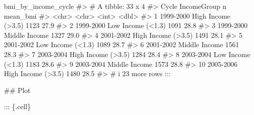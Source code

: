 \documentclass[
  letterpaper,
  DIV=11,
  numbers=noendperiod,
  oneside]{scrreprt}
\newenvironment{Shaded}{\begin{snugshade}}{\end{snugshade}}
\newcommand{\CommentTok}[1]{\textcolor[rgb]{0.37,0.37,0.37}{#1}}
\newcommand{\FunctionTok}[1]{\textcolor[rgb]{0.28,0.35,0.67}{#1}}
\newcommand{\InformationTok}[1]{\textcolor[rgb]{0.37,0.37,0.37}{#1}}
\newcommand{\NormalTok}[1]{\textcolor[rgb]{0.00,0.23,0.31}{#1}}
\begin{document}
\begin{Shaded}
\begin{Highlighting}[numbers=left,,]
\NormalTok{bmi\_by\_income\_cycle}
\CommentTok{\#\textgreater{} \# A tibble: 33 x 4}
\CommentTok{\#\textgreater{}    Cycle     IncomeGroup            n mean\_bmi}
\CommentTok{\#\textgreater{}    \textless{}chr\textgreater{}     \textless{}chr\textgreater{}              \textless{}int\textgreater{}    \textless{}dbl\textgreater{}}
\CommentTok{\#\textgreater{}  1 1999{-}2000 High Income (\textgreater{}3.5)  1123     27.9}
\CommentTok{\#\textgreater{}  2 1999{-}2000 Low Income (\textless{}1.3)   1091     28.8}
\CommentTok{\#\textgreater{}  3 1999{-}2000 Middle Income       1327     29.0}
\CommentTok{\#\textgreater{}  4 2001{-}2002 High Income (\textgreater{}3.5)  1491     28.1}
\CommentTok{\#\textgreater{}  5 2001{-}2002 Low Income (\textless{}1.3)   1089     28.7}
\CommentTok{\#\textgreater{}  6 2001{-}2002 Middle Income       1561     28.3}
\CommentTok{\#\textgreater{}  7 2003{-}2004 High Income (\textgreater{}3.5)  1284     28.4}
\CommentTok{\#\textgreater{}  8 2003{-}2004 Low Income (\textless{}1.3)   1183     28.6}
\CommentTok{\#\textgreater{}  9 2003{-}2004 Middle Income       1573     28.8}
\CommentTok{\#\textgreater{} 10 2005{-}2006 High Income (\textgreater{}3.5)  1480     28.5}
\CommentTok{\#\textgreater{} \# i 23 more rows}
\InformationTok{\textasciigrave{}\textasciigrave{}\textasciigrave{}}
\NormalTok{:::}


\FunctionTok{\#\# Plot}


\NormalTok{::: \{.cell\}}


\end{Highlighting}
\end{Shaded}
\end{document}
